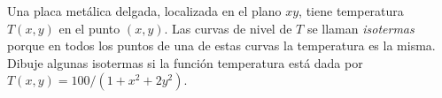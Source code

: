 \item Una placa metálica delgada, localizada en el plano $xy$, tiene temperatura $T(x, y)$ en el punto $(x, y)$. Las curvas de nivel de $T$ se llaman \textit{isotermas} porque en todos los puntos de una de estas curvas la temperatura es la misma. Dibuje algunas isotermas si la función temperatura está dada por $T(x, y) = 100/(1 + x^2 + 2y^2)$.
